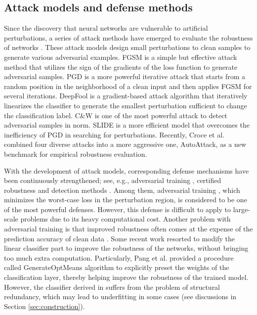 \documentclass[preprint,review,12pt]{elsarticle}
\numberwithin{equation}{section}
\begin{document}
 	
	\subsection{Attack models and defense methods}
	Since the discovery that neural networks are vulnerable to artificial perturbations,
	a series of attack methods have emerged to evaluate the robustness of networks
	\cite{carlini2017,croce2020,moosavi2016,madry2018,foolbox2017,szegedy2013,tramer2019,wang2021}.
   These attack models design small perturbations to clean samples to generate various adversarial examples.
    FGSM  \cite{goodfellow2015} is a simple but effective attack method that utilizes the sign of the gradients of the loss function to generate adversarial samples.
	PGD \cite{madry2018}  is a more powerful iterative attack that starts from a random position
	in the neighborhood of a clean input and then applies FGSM for several iterations.
	DeepFool \cite{moosavi2016} is a gradient-based attack algorithm that iteratively linearizes the classifier
    to generate the smallest perturbation sufficient to change the classification label.
	C\&W \cite{carlini2017} is one of the most powerful attack to detect adversarial samples in  norm.
	SLIDE \cite{tramer2019} is a more efficient model that  overcomes the inefficiency of PGD in searching for  perturbations.
	Recently, Croce et al. \cite{croce2020} combined four diverse attacks into a more aggressive one, AutoAttack,
	as a new benchmark for empirical robustness evaluation.
	
	
	With the development of attack models,
    corresponding defense mechanisms have been continuously strengthened;
	see, e.g., adversarial training \cite{goodfellow2015,madry2018,wang2021,zhang2019b}, certified robustness \cite{cohen2019,gowal2019} and detection methods \cite{guo2019}.
    Among them,  adversarial training \cite{madry2018}, which minimizes the worst-case loss in the perturbation region, is considered to be one of the most powerful defenses.
	However, this defense is difficult to apply to large-scale problems due to its heavy computational cost.
	Another problem with adversarial training is that improved robustness often comes at the expense of the prediction accuracy of clean data \cite{su2018,zhang2019b}.
    Some recent work \cite{pang2018,pang2020,wan2018}  resorted to modify the linear classifier part to improve the robustness of the networks,
    without bringing too much extra computation.
	Particularly, Pang et al. \cite{pang2018,pang2020} provided a procedure called GenerateOptMeans algorithm
    to explicitly preset the weights of the classification layer,
    thereby helping improve the robustness of the trained model.
	However, the classifier derived in \cite{pang2018,pang2020} suffers from the problem of structural redundancy,
    which may lead to underfitting in some cases (see discussions in Section \ref{sec:construction}).
	
\end{document}
